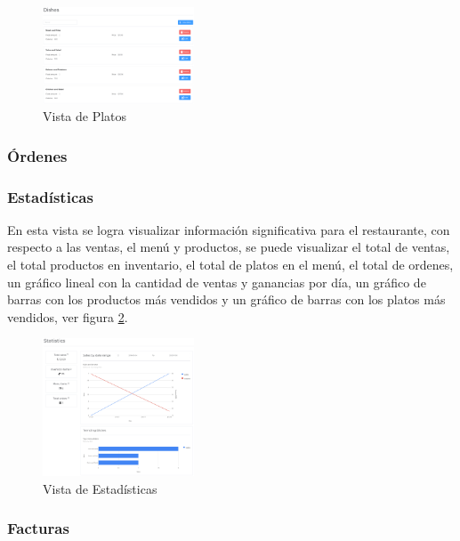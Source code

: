 \begin{figure}[H]
    \centering
    \includegraphics[width=0.4\textwidth]{assets/dishes.png}
    \caption{Vista de Platos}
    \label{fig:dishes}
\end{figure}

\subsubsection{Órdenes}

\subsubsection{Estadísticas}

En esta vista se logra visualizar información significativa para el 
restaurante, con respecto a las ventas, el menú y productos, se puede 
visualizar el total de ventas, el total productos en inventario, el total 
de platos en el menú, el total de ordenes, un gráfico lineal con la 
cantidad de ventas y ganancias por día, un gráfico de barras con los  
productos más vendidos y un gráfico de barras con los platos más vendidos, 
ver figura \ref{fig:statistics}.

\begin{figure}[H]
    \centering
    \includegraphics[width=0.4\textwidth]{assets/statistics.png}
    \caption{Vista de Estadísticas}
    \label{fig:statistics}
\end{figure}

\subsubsection{Facturas}


